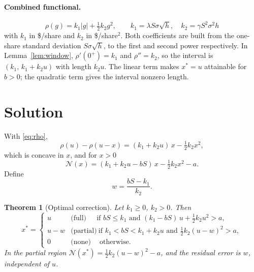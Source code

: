 \documentclass[11pt,a4paper]{article}
\newtheorem{theorem}{Theorem}
\theoremstyle{remark}
\newcommand{\NB}{\mathcal{N}}
\begin{document}
\paragraph{Combined functional.}
\begin{equation}
  \boxed{\;\rho(g) = k_1|g| + \tfrac12k_2g^2, \qquad
  k_1 = \lambda S\sigma\sqrt h, \quad k_2 = \gamma S^2\sigma^2 h\;}
  \label{eq:rho}
\end{equation}
with $k_1$ in \$/share and $k_2$ in \$/share$^2$. Both coefficients are built from the
one-share standard deviation $S\sigma\sqrt h$, to the first and second power respectively.
In Lemma~\ref{lem:window}, $\rho'(0^+) = k_1$ and $\rho'' = k_2$, so the interval is
$(k_1,\,k_1 + k_2u)$ with length $k_2u$. The linear term makes $x^* = u$ attainable for
$b>0$; the quadratic term gives the interval nonzero length.

\section{Solution}\label{sec:solution}

With \eqref{eq:rho},
\begin{equation}
  \rho(u) - \rho(u-x) = (k_1 + k_2u)\,x - \tfrac12 k_2x^2 ,
\end{equation}
which is concave in $x$, and for $x>0$
\begin{equation}
  \NB(x) = (k_1 + k_2u - bS)\,x - \tfrac12k_2x^2 - a .
\end{equation}
Define
\begin{equation}
  w = \frac{bS - k_1}{k_2}.
\end{equation}

\begin{theorem}[Optimal correction]\label{thm:phases}
Let $k_1\ge 0$, $k_2>0$. Then
\begin{equation}
  x^* =
  \begin{cases}
    u     & \text{(full)} \quad\ \ \text{if } bS\le k_1 \text{ and }
            (k_1 - bS)\,u + \tfrac12k_2u^2 > a,\\[2pt]
    u - w & \text{(partial)} \ \text{if } k_1 < bS < k_1 + k_2u \text{ and }
            \tfrac12k_2(u-w)^2 > a,\\[2pt]
    0     & \text{(none)} \quad\ \text{otherwise.}
  \end{cases}
  \label{eq:xstar}
\end{equation}
In the partial region $\NB(x^*) = \tfrac12k_2(u-w)^2 - a$, and the residual error is $w$,
independent of $u$.
\end{theorem}
\end{document}
